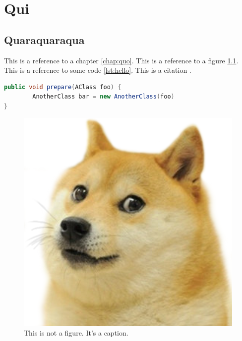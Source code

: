 \chapter{Qui}
\label{chap:qui}

\section{Quaraquaraqua}
\label{sec:quaqaraqua}

This is a reference to a chapter \ref{chap:quo}. This is a reference to a figure \ref{fig:doge}. This is a reference to some code \ref{lst:hello}. This is a citation \cite{famous:paper}.



\begin{lstlisting}[language=Java, label=lst:java, caption={Some code in another language than the default one}]
public void prepare(AClass foo) {
        AnotherClass bar = new AnotherClass(foo)
}
\end{lstlisting}

\Blindtext

\begin{figure}
\begin{center}
\includegraphics[width=0.5\columnwidth]{images/doge.png}
\end{center}
\caption{This is not a figure. It's a caption.}
\label{fig:doge}
\end{figure}
